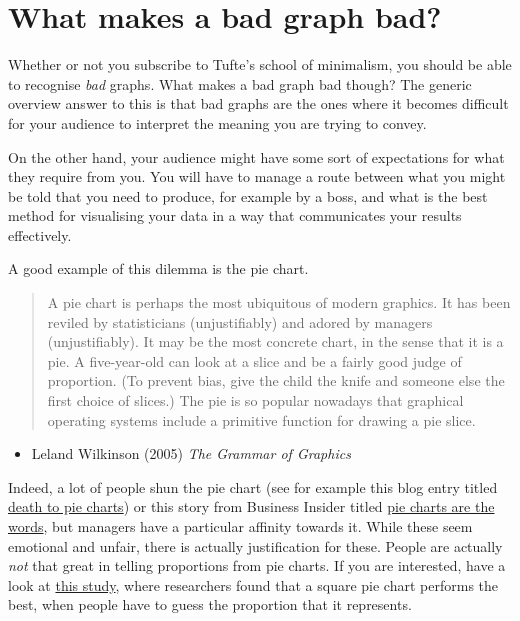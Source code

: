 \documentclass[]{book}
\providecommand{\tightlist}{%
  \setlength{\itemsep}{0pt}\setlength{\parskip}{0pt}}
\theoremstyle{definition}
\theoremstyle{definition}
\theoremstyle{definition}
\theoremstyle{remark}
\begin{document}
\hypertarget{what-makes-a-bad-graph-bad}{%
\section{What makes a bad graph bad?}\label{what-makes-a-bad-graph-bad}}

Whether or not you subscribe to Tufte's school of minimalism, you should
be able to recognise \emph{bad} graphs. What makes a bad graph bad
though? The generic overview answer to this is that bad graphs are the
ones where it becomes difficult for your audience to interpret the
meaning you are trying to convey.

On the other hand, your audience might have some sort of expectations
for what they require from you. You will have to manage a route between
what you might be told that you need to produce, for example by a boss,
and what is the best method for visualising your data in a way that
communicates your results effectively.

A good example of this dilemma is the pie chart.

\begin{quote}
A pie chart is perhaps the most ubiquitous of modern graphics. It has
been reviled by statisticians (unjustifiably) and adored by managers
(unjustifiably). It may be the most concrete chart, in the sense that it
is a pie. A five-year-old can look at a slice and be a fairly good judge
of proportion. (To prevent bias, give the child the knife and someone
else the first choice of slices.) The pie is so popular nowadays that
graphical operating systems include a primitive function for drawing a
pie slice.
\end{quote}

\begin{itemize}
\tightlist
\item
  Leland Wilkinson (2005) \emph{The Grammar of Graphics}
\end{itemize}

Indeed, a lot of people shun the pie chart (see for example this blog
entry titled
\href{http://www.storytellingwithdata.com/blog/2011/07/death-to-pie-charts}{death
to pie charts}) or this story from Business Insider titled
\href{http://www.businessinsider.com/pie-charts-are-the-worst-2013-6?IR=T}{pie
charts are the words}, but managers have a particular affinity towards
it. While these seem emotional and unfair, there is actually
justification for these. People are actually \emph{not} that great in
telling proportions from pie charts. If you are interested, have a look
at
\href{https://eagereyes.org/blog/2016/a-reanalysis-of-a-study-about-square-pie-charts-from-2009}{this
study}, where researchers found that a square pie chart performs the
best, when people have to guess the proportion that it represents.
\end{document}

